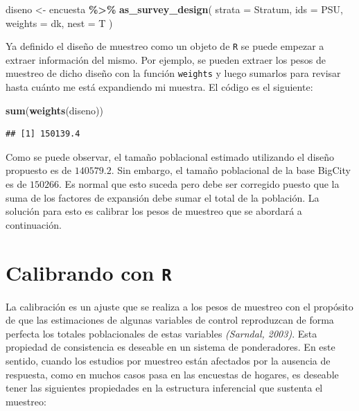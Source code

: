 \documentclass[
  12pt,
]{book}
\newenvironment{Shaded}{\begin{snugshade}}{\end{snugshade}}
\newcommand{\AttributeTok}[1]{\textcolor[rgb]{0.13,0.29,0.53}{#1}}
\newcommand{\FunctionTok}[1]{\textcolor[rgb]{0.13,0.29,0.53}{\textbf{#1}}}
\newcommand{\NormalTok}[1]{#1}
\newcommand{\OtherTok}[1]{\textcolor[rgb]{0.56,0.35,0.01}{#1}}
\newcommand{\SpecialCharTok}[1]{\textcolor[rgb]{0.81,0.36,0.00}{\textbf{#1}}}
\begin{document}
\begin{Shaded}
\begin{Highlighting}[]
\NormalTok{diseno }\OtherTok{\textless{}{-}}\NormalTok{ encuesta }\SpecialCharTok{\%\textgreater{}\%}
  \FunctionTok{as\_survey\_design}\NormalTok{(}
    \AttributeTok{strata =}\NormalTok{ Stratum,}
    \AttributeTok{ids =}\NormalTok{ PSU,}
    \AttributeTok{weights =}\NormalTok{ dk,}
    \AttributeTok{nest =}\NormalTok{ T}
\NormalTok{  )}
\end{Highlighting}
\end{Shaded}

Ya definido el diseño de muestreo como un objeto de \texttt{R} se puede empezar a extraer información del mismo. Por ejemplo, se pueden extraer los pesos de muestreo de dicho diseño con la función \texttt{weights} y luego sumarlos para revisar hasta cuánto me está expandiendo mi muestra. El código es el siguiente:

\begin{Shaded}
\begin{Highlighting}[]
\FunctionTok{sum}\NormalTok{(}\FunctionTok{weights}\NormalTok{(diseno))}
\end{Highlighting}
\end{Shaded}

\begin{verbatim}
## [1] 150139.4
\end{verbatim}

Como se puede observar, el tamaño poblacional estimado utilizando el diseño propuesto es de \(140579.2\). Sin embargo, el tamaño poblacional de la base BigCity es de \(150266\). Es normal que esto suceda pero debe ser corregido puesto que la suma de los factores de expansión debe sumar el total de la población. La solución para esto es calibrar los pesos de muestreo que se abordará a continuación.

\section{\texorpdfstring{Calibrando con \texttt{R}}{Calibrando con R}}\label{calibrando-con-r}

La calibración es un ajuste que se realiza a los pesos de muestreo con el propósito de que las estimaciones de algunas variables de control reproduzcan de forma perfecta los totales poblacionales de estas variables \emph{(Sarndal, 2003)}. Esta propiedad de consistencia es deseable en un sistema de ponderadores. En este sentido, cuando los estudios por muestreo están afectados por la ausencia de respuesta, como en muchos casos pasa en las encuestas de hogares, es deseable tener las siguientes propiedades en la estructura inferencial que sustenta el muestreo:
\end{document}
